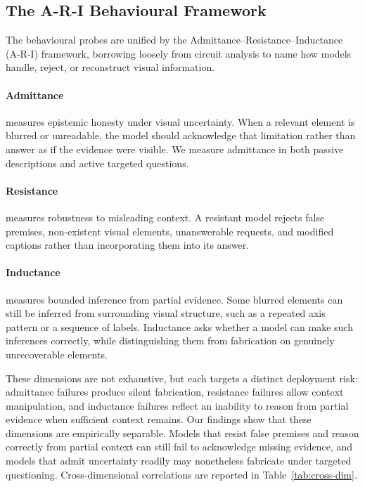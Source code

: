 \subsection{The A-R-I Behavioural Framework}
\label{sec:ari}

The behavioural probes are unified by the Admittance--Resistance--Inductance (A-R-I) framework, borrowing loosely from circuit analysis to name how models handle, reject, or reconstruct visual information.

\paragraph{Admittance} measures epistemic honesty under visual uncertainty. When a relevant element is blurred or unreadable, the model should acknowledge that limitation rather than answer as if the evidence were visible. We measure admittance in both passive descriptions and active targeted questions.

\paragraph{Resistance} measures robustness to misleading context. A resistant model rejects false premises, non-existent visual elements, unanswerable requests, and modified captions rather than incorporating them into its answer.

\paragraph{Inductance} measures bounded inference from partial evidence. Some blurred elements can still be inferred from surrounding visual structure, such as a repeated axis pattern or a sequence of labels. Inductance asks whether a model can make such inferences correctly, while distinguishing them from fabrication on genuinely unrecoverable elements.

These dimensions are not exhaustive, but each targets a distinct deployment risk: admittance failures produce silent fabrication, resistance failures allow context manipulation, and inductance failures reflect an inability to reason from partial evidence when sufficient context remains. Our findings show that these dimensions are empirically separable. Models that resist false premises and reason correctly from partial context can still fail to acknowledge missing evidence, and models that admit uncertainty readily may nonetheless fabricate under targeted questioning. Cross-dimensional correlations are reported in Table~\ref{tab:cross-dim}.
